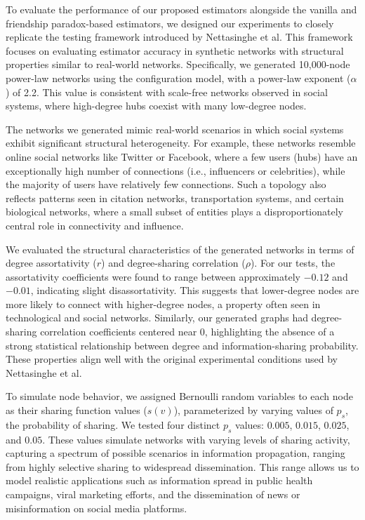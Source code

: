 \documentclass{article}
\begin{document}
To evaluate the performance of our proposed estimators alongside the vanilla and friendship paradox-based estimators, we designed our experiments to closely replicate the testing framework introduced by Nettasinghe et al. This framework focuses on evaluating estimator accuracy in synthetic networks with structural properties similar to real-world networks. Specifically, we generated 10,000-node power-law networks using the configuration model, with a power-law exponent ($\alpha$) of 2.2. This value is consistent with scale-free networks observed in social systems, where high-degree hubs coexist with many low-degree nodes.

The networks we generated mimic real-world scenarios in which social systems exhibit significant structural heterogeneity. For example, these networks resemble online social networks like Twitter or Facebook, where a few users (hubs) have an exceptionally high number of connections (i.e., influencers or celebrities), while the majority of users have relatively few connections. Such a topology also reflects patterns seen in citation networks, transportation systems, and certain biological networks, where a small subset of entities plays a disproportionately central role in connectivity and influence.

We evaluated the structural characteristics of the generated networks in terms of degree assortativity ($r$) and degree-sharing correlation ($\rho$). For our tests, the assortativity coefficients were found to range between approximately $-0.12$ and $-0.01$, indicating slight disassortativity. This suggests that lower-degree nodes are more likely to connect with higher-degree nodes, a property often seen in technological and social networks. Similarly, our generated graphs had degree-sharing correlation coefficients centered near $0$, highlighting the absence of a strong statistical relationship between degree and information-sharing probability. These properties align well with the original experimental conditions used by Nettasinghe et al.

To simulate node behavior, we assigned Bernoulli random variables to each node as their sharing function values ($s(v)$), parameterized by varying values of $p_s$, the probability of sharing. We tested four distinct $p_s$ values: $0.005$, $0.015$, $0.025$, and $0.05$. These values simulate networks with varying levels of sharing activity, capturing a spectrum of possible scenarios in information propagation, ranging from highly selective sharing to widespread dissemination. This range allows us to model realistic applications such as information spread in public health campaigns, viral marketing efforts, and the dissemination of news or misinformation on social media platforms.
\end{document}
